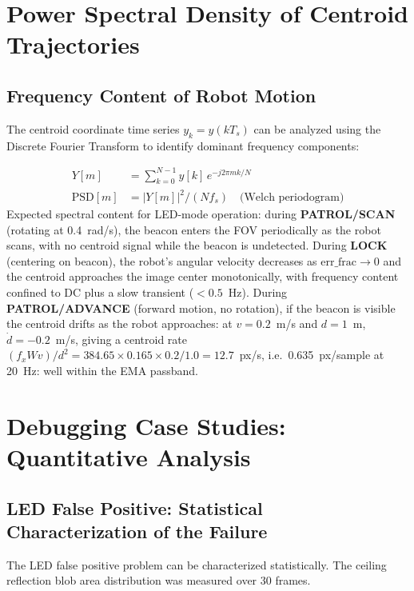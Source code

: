 \section{Power Spectral Density of Centroid Trajectories}

\subsection{Frequency Content of Robot Motion}

The centroid coordinate time series $y_k = y(kT_s)$ can be analyzed using the Discrete Fourier Transform to identify dominant frequency components:

\begin{eqblock}
\begin{align}
Y[m] &= \sum_{k=0}^{N-1} y[k]\, e^{-j2\pi mk/N} \\
\text{PSD}[m] &= |Y[m]|^2/(Nf_s) \quad \text{(Welch periodogram)}
\end{align}
Expected spectral content for LED-mode operation: during \textbf{PATROL/SCAN} (rotating at 0.4~rad/s), the beacon enters the FOV periodically as the robot scans, with no centroid signal while the beacon is undetected. During \textbf{LOCK} (centering on beacon), the robot's angular velocity decreases as $\text{err\_frac}\to0$ and the centroid approaches the image center monotonically, with frequency content confined to DC plus a slow transient ($<0.5$~Hz). During \textbf{PATROL/ADVANCE} (forward motion, no rotation), if the beacon is visible the centroid drifts as the robot approaches: at $v=0.2$~m/s and $d=1$~m, $\dot d=-0.2$~m/s, giving a centroid rate $(f_x W v)/d^2 = 384.65\times0.165\times0.2/1.0 = 12.7$~px/s, i.e.\ 0.635~px/sample at 20~Hz: well within the EMA passband.
\end{eqblock}

\section{Debugging Case Studies: Quantitative Analysis}

\subsection{LED False Positive: Statistical Characterization of the Failure}

The LED false positive problem can be characterized statistically. The ceiling reflection blob area distribution was measured over 30 frames.

